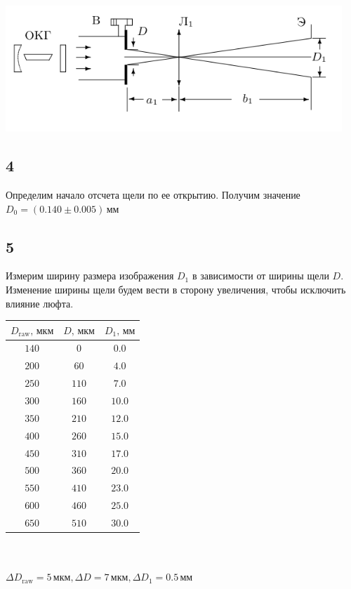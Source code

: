 \begin{center}
\includegraphics[width=0.95\textwidth]{1.png}
\end{center}

\subsection*{4}
Определим начало отсчета щели по ее открытию. Получим значение $D_0 = (0.140\pm0.005)\,\text{мм}$

\subsection*{5}
Измерим ширину размера изображения $D_1$ в зависимости от ширины щели $D$. Изменение ширины щели будем вести в сторону увеличения, чтобы исключить влияние люфта.

\begin{center}
\begin{tabular}{|c|c|c|}\hline
$D_{\text{raw}}\text{, мкм}$&$D\text{, мкм}$&$D_1\text{, мм}$\\\hline
$140$&$0$&$0.0$\\\hline
$200$&$60$&$4.0$\\\hline
$250$&$110$&$7.0$\\\hline
$300$&$160$&$10.0$\\\hline
$350$&$210$&$12.0$\\\hline
$400$&$260$&$15.0$\\\hline
$450$&$310$&$17.0$\\\hline
$500$&$360$&$20.0$\\\hline
$550$&$410$&$23.0$\\\hline
$600$&$460$&$25.0$\\\hline
$650$&$510$&$30.0$\\\hline
\end{tabular}\\~\\
$\Delta D_{\text{raw}}=5\,\text{мкм}, \Delta D=7\,\text{мкм}, \Delta D_1=0.5\,\text{мм}$
\end{center}


